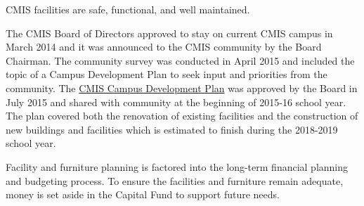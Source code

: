 

\begin{findings}
CMIS facilities are safe, functional, and well maintained. 


The CMIS Board of Directors approved to stay on current CMIS campus in March 2014 and it was announced to the CMIS community by the Board Chairman. The community survey was conducted in April 2015 and included the topic of a Campus Development Plan to seek input and priorities from the community. The \href{http://blogs.cmis.ac.th/campus/}{CMIS Campus Development Plan} was approved by the Board in July 2015 and shared with community at the beginning of 2015-16 school year. The plan covered both the renovation of existing facilities and the construction of new buildings and facilities which is estimated to finish during the 2018-2019 school year.

Facility and furniture planning is factored into the long-term financial planning and budgeting process. To ensure the facilities and furniture remain adequate, money is set aside in the Capital Fund to support future needs.



\end{findings}
